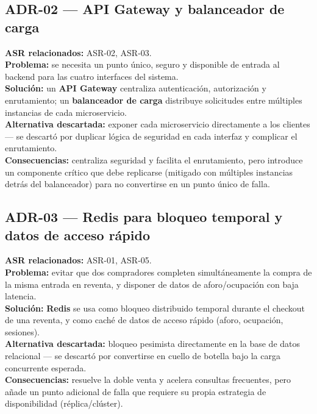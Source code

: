 \documentclass[11pt,a4paper]{article}
\begin{document}
\subsection*{ADR-02 --- API Gateway y balanceador de carga}
\textbf{ASR relacionados:} ASR-02, ASR-03.\\
\textbf{Problema:} se necesita un punto único, seguro y disponible de entrada al backend para las
cuatro interfaces del sistema.\\
\textbf{Solución:} un \textbf{API Gateway} centraliza autenticación, autorización y enrutamiento;
un \textbf{balanceador de carga} distribuye solicitudes entre múltiples instancias de cada
microservicio.\\
\textbf{Alternativa descartada:} exponer cada microservicio directamente a los clientes — se
descartó por duplicar lógica de seguridad en cada interfaz y complicar el enrutamiento.\\
\textbf{Consecuencias:} centraliza seguridad y facilita el enrutamiento, pero introduce un
componente crítico que debe replicarse (mitigado con múltiples instancias detrás del
balanceador) para no convertirse en un punto único de falla.

\subsection*{ADR-03 --- Redis para bloqueo temporal y datos de acceso rápido}
\textbf{ASR relacionados:} ASR-01, ASR-05.\\
\textbf{Problema:} evitar que dos compradores completen simultáneamente la compra de la misma
entrada en reventa, y disponer de datos de aforo/ocupación con baja latencia.\\
\textbf{Solución:} \textbf{Redis} se usa como bloqueo distribuido temporal durante el checkout de
una reventa, y como caché de datos de acceso rápido (aforo, ocupación, sesiones).\\
\textbf{Alternativa descartada:} bloqueo pesimista directamente en la base de datos relacional —
se descartó por convertirse en cuello de botella bajo la carga concurrente esperada.\\
\textbf{Consecuencias:} resuelve la doble venta y acelera consultas frecuentes, pero añade un
punto adicional de falla que requiere su propia estrategia de disponibilidad (réplica/clúster).
\end{document}
